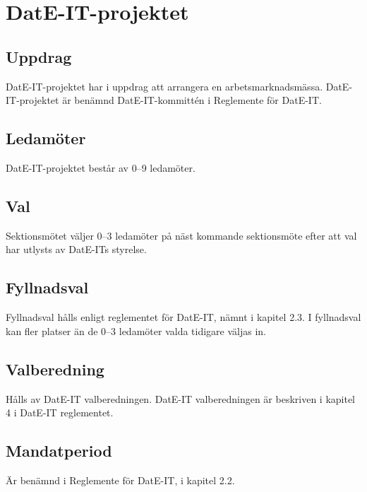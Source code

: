 \section{DatE-IT-projektet}
\subsection{Uppdrag}
DatE-IT-projektet har i uppdrag att arrangera en arbetsmarknadsmässa.
DatE-IT-projektet är benämnd DatE-IT-kommittén i Reglemente för DatE-IT.
\subsection{Ledamöter}
DatE-IT-projektet består av 0--9 ledamöter.
\subsection{Val} 
Sektionsmötet väljer 0--3 ledamöter på näst kommande sektionsmöte efter att val har utlysts av DatE-ITs styrelse.
\subsection{Fyllnadsval}
Fyllnadsval hålls enligt reglementet för DatE-IT, nämnt i kapitel 2.3.
I fyllnadsval kan fler platser än de 0--3 ledamöter valda tidigare väljas in.
\subsection{Valberedning}
Hålls av DatE-IT valberedningen.
DatE-IT valberedningen är beskriven i kapitel 4 i DatE-IT reglementet.
\subsection{Mandatperiod}
Är benämnd i Reglemente för DatE-IT, i kapitel 2.2.

\newpage
